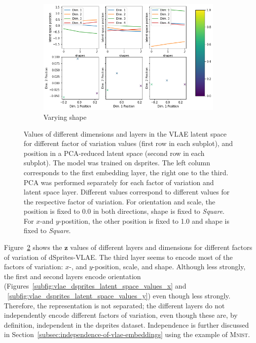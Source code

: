 \begin{figure}
\begin{subfigure}{.48\textwidth}
        \includegraphics[width=\textwidth]{images/latent_space_traversals/vlae_dsprites_shape_latent_space_values.png}
        \caption{Varying shape}
        \label{subfig:vlae_dsprites_latent_space_values_shape}
    \end{subfigure}
    \caption[VLAE on dsprites: Latent Space Values]{Values of different dimensions and layers in the VLAE latent space for different factor of variation values (first row in each subplot), and position in a \ac{PCA}-reduced latent space (second row in each subplot). The model was trained on dsprites. The left column corresponds to the first embedding layer, the right one to the third. \ac{PCA} was performed separately for each factor of variation and latent space layer. Different values correspond to different values for the respective factor of variation. For orientation and scale, the position is fixed to 0.0 in both directions, shape is fixed to \textit{Square}. For $x$-and $y$-postition, the other position is fixed to 1.0 and shape is fixed to \textit{Square}.}
    \label{fig:vlae_dsprites_latent_space_values}
\end{figure}
Figure~\ref{fig:vlae_dsprites_latent_space_values} shows the $\bm{z}$ values of different layers and dimensions for different factors of variation of dSprites-\ac{VLAE}.
The third layer seems to encode most of the factors of variation: $x$-, and $y$-position, scale, and shape.
Although less strongly, the first and second layers encode orientation (Figures~\ref{subfig:vlae_dsprites_latent_space_values_x} and ~\ref{subfig:vlae_dsprites_latent_space_values_y}) even though less strongly.
Therefore, the representation is not separated;
the different layers do not independently encode different factors of variation, even though these are, by definition, independent in the dsprites dataset.
Independence is further discussed in Section~\ref{subsec:independence-of-vlae-embeddings} using the example of \textsc{Mnist}.

